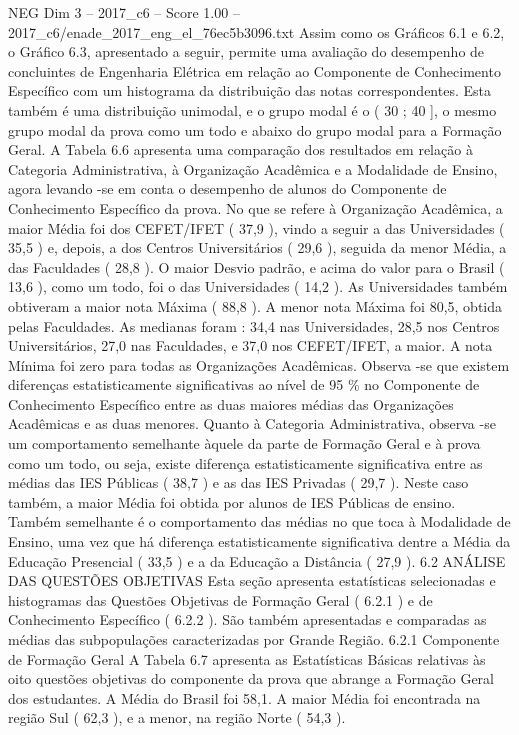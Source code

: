 \begin{textsample}{NEG Dim 3 – 2017\_c6 – Score 1.00 – 2017\_c6/enade\_2017\_eng\_el\_76ec5b3096.txt}
Assim como os Gráficos 6.1 e 6.2, o Gráfico 6.3, apresentado a seguir, permite uma avaliação do desempenho de concluintes de Engenharia Elétrica em relação ao Componente de Conhecimento Específico com um histograma da distribuição das notas correspondentes.
Esta também é uma distribuição unimodal, e o grupo modal é o ( 30 ; 40 ], o mesmo grupo modal da prova como um todo e abaixo do grupo modal para a Formação Geral.
A Tabela 6.6 apresenta uma comparação dos resultados em relação à Categoria Administrativa, à Organização Acadêmica e a Modalidade de Ensino, agora levando -se em conta o desempenho de alunos do Componente de Conhecimento Específico da prova.
No que se refere à Organização Acadêmica, a maior Média foi dos CEFET/IFET ( 37,9 ), vindo a seguir a das Universidades ( 35,5 ) e, depois, a dos Centros Universitários ( 29,6 ), seguida da menor Média, a das Faculdades ( 28,8 ).
O maior Desvio padrão, e acima do valor para o Brasil ( 13,6 ), como um todo, foi o das Universidades ( 14,2 ).
As Universidades também obtiveram a maior nota Máxima ( 88,8 ).
A menor nota Máxima foi 80,5, obtida pelas Faculdades.
As medianas foram : 34,4 nas Universidades, 28,5 nos Centros Universitários, 27,0 nas Faculdades, e 37,0 nos CEFET/IFET, a maior.
A nota Mínima foi zero para todas as Organizações Acadêmicas.
Observa -se que existem diferenças estatisticamente significativas ao nível de 95 \% no Componente de Conhecimento Específico entre as duas maiores médias das Organizações Acadêmicas e as duas menores.
Quanto à Categoria Administrativa, observa -se um comportamento semelhante àquele da parte de Formação Geral e à prova como um todo, ou seja, existe diferença estatisticamente significativa entre as médias das IES Públicas ( 38,7 ) e as das IES Privadas ( 29,7 ).
Neste caso também, a maior Média foi obtida por alunos de IES Públicas de ensino.
Também semelhante é o comportamento das médias no que toca à Modalidade de Ensino, uma vez que há diferença estatisticamente significativa dentre a Média da Educação Presencial ( 33,5 ) e a da Educação a Distância ( 27,9 ). 6.2 ANÁLISE DAS QUESTÕES OBJETIVAS Esta seção apresenta estatísticas selecionadas e histogramas das Questões Objetivas de Formação Geral ( 6.2.1 ) e de Conhecimento Específico ( 6.2.2 ).
São também apresentadas e comparadas as médias das subpopulações caracterizadas por Grande Região. 6.2.1 Componente de Formação Geral A Tabela 6.7 apresenta as Estatísticas Básicas relativas às oito questões objetivas do componente da prova que abrange a Formação Geral dos estudantes.
A Média do Brasil foi 58,1.
A maior Média foi encontrada na região Sul ( 62,3 ), e a menor, na região Norte ( 54,3 ).

\end{textsample}
